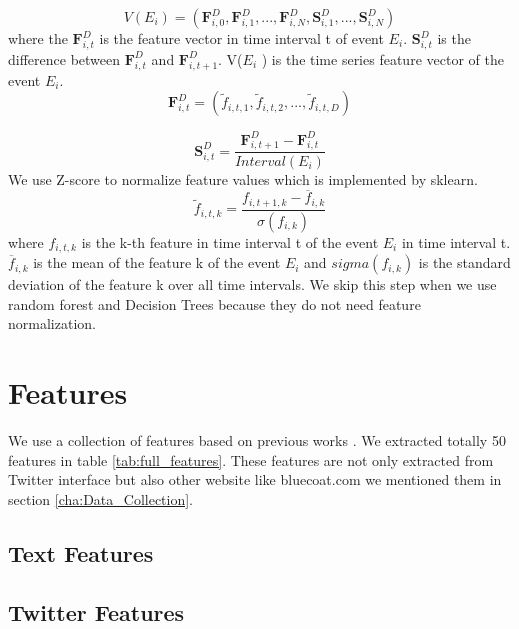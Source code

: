 \begin{equation}
 V(E_i)=(\textbf{F}^D_{i,0}, \textbf{F}^D_{i,1},..., \textbf{F}^D_{i,N},\textbf{S}^D_{i,1},..., \textbf{S}^D_{i,N})
\end{equation}
where the $\textbf{F}^D_{i,t}$ is the feature vector in time interval t of event $E_i$.  $\textbf{S}^D_{i,t}$ is the difference between $\textbf{F}^D_{i,t}$ and $\textbf{F}^D_{i,t+1}$. V($E_i$ ) is the time series feature vector of the event $E_i$.
\begin{equation}
\textbf{F}^D_{i,t}=(\widetilde{ f}_{i,t,1},\widetilde{ f}_{i,t,2},...,\widetilde{ f}_{i,t,D})
\end{equation}

\begin{equation}
\textbf{S}^D_{i,t}=\frac{\textbf{F}^D_{i,t+1}-\textbf{F}^D_{i,t}}{Interval(E_i)}
\end{equation}
We use Z-score to normalize feature values which is implemented by sklearn.
\begin{equation}
\widetilde{f}_{i,t,k}=\frac{f_{i,t+1,k}-\overline{f}_{i,k}}{\sigma(f_{i,k})}
\end{equation}
where $f_{i,t,k}$ is the k-th feature in time interval t of the event $E_i$ in time interval t. $\overline{f}_{i,k}$ is the mean of the feature k of the event $E_i$ and $sigma(f_{i,k})$ is the standard deviation of the feature k over all time intervals. We skip this step when we use random forest and Decision Trees because they do not need feature normalization.

  \section{ Features} 
 
 We use a collection of features based on previous works  
\cite{castillo2011information}\cite{gupta2014tweetcred} \cite{yang2012automatic}\cite{liu2015real}\cite{madetecting}\cite{mendoza2010twitter}\cite{ma2015detect}\cite{wu2015false}\cite{jin2013epidemiological}. We extracted totally 50 features in table \ref{tab:full_features}. These features are not only extracted from Twitter interface but also other website like bluecoat.com we mentioned them in section \ref{cha:Data_Collection}. 
\subsection{Text Features}

\subsection{Twitter Features}
